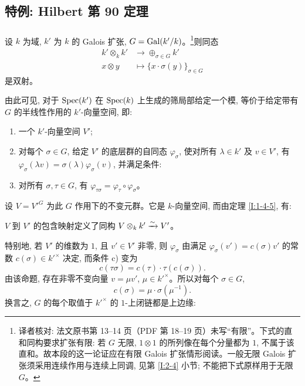 \subsection{特例: Hilbert 第 90 定理}\label{I:1-5}

\subsubsection{}\label{I:1-5-1}

设 $k$ 为域, $k'$ 为 $k$ 的 Galois 扩张, $G=\operatorname{Gal}(k'/k)$。\footnote{译者核对: 法文原书第 13--14 页（PDF 第 18--19 页）未写“有限”。下式的直和同构要求扩张有限: 若 $G$ 无限, $1\otimes1$ 的所列像在每个分量都为 $1$, 不属于该直和。故本段的这一论证应在有限 Galois 扩张情形阅读。一般无限 Galois 扩张须采用连续作用与连续上同调, 见第 \ref{I:2-4} 小节; 不能把下式原样用于无限 $G$。}则同态
\begin{align*}
  k'\otimes_k k' &\to \oplus_{\sigma\in G} k' \\
  x\otimes y     &\mapsto \{x\cdot \sigma(y)\}_{\sigma\in G}
\end{align*}
是双射。

由此可见, 对于 $\operatorname{Spec}(k')$ 在 $\operatorname{Spec}(k)$ 上生成的筛局部给定一个模, 等价于给定带有 $G$ 的半线性作用的 $k'$-向量空间, 即:
\begin{enumerate}[\indent a)]
  \item 一个 $k'$-向量空间 $V'$;
  \item 对每个 $\sigma\in G$, 给定 $V'$ 的底层群的自同态 $\varphi_\sigma$, 使对所有 $\lambda\in k'$ 及 $v\in V'$, 有 $\varphi_\sigma(\lambda v)=\sigma(\lambda)\varphi_\sigma(v)$, 并满足条件:
  \item 对所有 $\sigma,\tau\in G$, 有
    $\varphi_{\tau\sigma}=\varphi_\tau\circ\varphi_\sigma$。
\end{enumerate}

设 $V={V'}^G$ 为此 $G$ 作用下的不变元群。它是 $k$-向量空间, 而由定理 \ref{I:1-4-5}, 有:

\begin{proposition}\label{I:1-5-2}
$V$ 到 $V'$ 的包含映射定义了同构
$V\otimes_k k'\xrightarrow\sim V'$。
\end{proposition}

特别地, 若 $V'$ 的维数为 $1$, 且 $v'\in V'$ 非零, 则 $\varphi_\sigma$ 由满足 $\varphi_\sigma(v')=c(\sigma)v'$ 的常数 $c(\sigma)\in {k'}^\times$ 决定, 而条件 c) 变为
\[
  c(\tau\sigma) = c(\tau)\cdot \tau(c(\sigma))\text{.}
\]
由该命题, 存在非零不变向量 $v=\mu v'$, $\mu\in {k'}^\times$。所以对每个 $\sigma\in G$,
\[
  c(\sigma) = \mu\cdot \sigma(\mu^{-1})\text{.}
\]
换言之, $G$ 的每个取值于 ${k'}^\times$ 的 $1$-上闭链都是上边缘:

